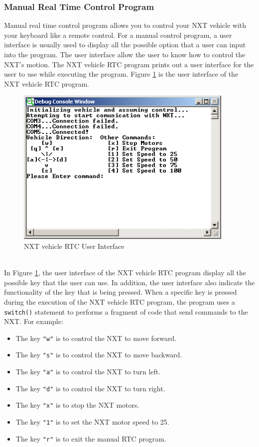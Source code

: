\documentclass[12pt]{article}
\begin{document}
\subsubsection{Manual Real Time Control Program}
Manual real time control program allows you to control your NXT vehicle with your keyboard like a 
    remote control.
For a manual control program, a user interface is usually used to display all the possible option
    that a user can input into the program.
The user interface allow the user to know how to control the NXT's motion.
The NXT vehicle RTC program prints out a user interface for the user to use while executing the program.
Figure \ref{fig_NXT_GUI} is the user interface of the NXT vehicle RTC program.
\begin{figure}[h]
  \begin{center}
    \includegraphics[height=3in]{figure/mindstorm/RTC_GUI.png}
    \caption{NXT vehicle RTC User Interface \label{fig_NXT_GUI}}
  \end{center}
\end{figure}
\newline
\\
In Figure \ref{fig_NXT_GUI}, the user interface of the NXT vehicle RTC program display all the possible key that the user can use.
In addition, the user interface also indicate the functionality of the key that is being pressed.
When a specific key is pressed during the execution of the NXT vehicle RTC program, the program uses a \verb+switch()+
    statement to performs a fragment of code that send commands to the NXT.
For example:
\begin{itemize}
\item The key \verb+"w"+ is to control the NXT to move forward.
\item The key \verb+"s"+ is to control the NXT to move backward.
\item The key \verb+"a"+ is to control the NXT to turn left.
\item The key \verb+"d"+ is to control the NXT to turn right.
\item The key \verb+"x"+ is to stop the NXT motors.
\item The key \verb+"1"+ is to set the NXT motor speed to 25.
\item The key \verb+"r"+ is to exit the manual RTC program.
\end{itemize}
\end{document}
